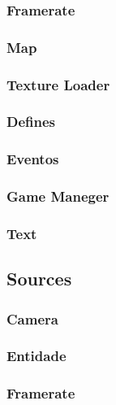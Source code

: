 \subsubsection{Framerate}

\subsubsection{Map}

\subsubsection{Texture Loader}

\subsubsection{Defines}

\subsubsection{Eventos}

\subsubsection{Game Maneger}

\subsubsection{Text}


\subsection{Sources}\label{.cpp}

\subsubsection{Camera}

\subsubsection{Entidade}

\subsubsection{Framerate}

